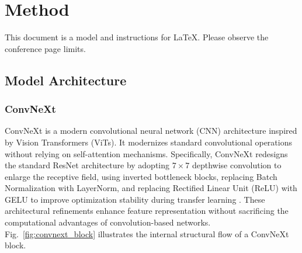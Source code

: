 \documentclass[conference]{IEEEtran}
\begin{document}
\section{Method}
This document is a model and instructions for \LaTeX.
Please observe the conference page limits. 

\subsection{Model Architecture}

\subsubsection{ConvNeXt}

ConvNeXt is a modern convolutional neural network (CNN) architecture inspired by Vision Transformers (ViTs). It modernizes standard convolutional operations without relying on self-attention mechanisms. Specifically, ConvNeXt redesigns the standard ResNet architecture by adopting $7 \times 7$ depthwise convolution to enlarge the receptive field, using inverted bottleneck blocks, replacing Batch Normalization with LayerNorm, and replacing Rectified Linear Unit (ReLU) with GELU to improve optimization stability during transfer learning \cite{Liu2022}. These architectural refinements enhance feature representation without sacrificing the computational advantages of convolution-based networks. Fig.~\ref{fig:convnext_block} illustrates the internal structural flow of a ConvNeXt block.
\end{document}

